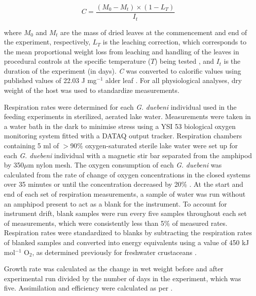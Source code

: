 \begin{equation}
C=  \frac{(M_0-M_t)\times(1-L_T)}{I_t}
\end{equation}

where $M_0$ and $M_t$ are the mass of dried leaves at the commencement and end of the experiment, respectively, $L_T$ is the leaching correction, which corresponds to the mean proportional weight loss from leaching and handling of the leaves in procedural controls at the specific temperature ($T$) being tested \cite{nilsson1974}, and $I_t$ is the duration of the experiment (in days). \emph{C} was converted to calorific values using published values of 22.03 J mg$^{-1}$  alder leaf \citep{adcock1982}. For all physiological analyses, dry weight of the host was used to standardize measurements. 

Respiration rates were determined for each \emph{G. duebeni} individual used in the feeding experiments in sterilized, aerated lake water. Measurements were taken in a water bath in the dark to minimise stress using a YSI 53 biological oxygen monitoring system fitted with a DATAQ output tracker. Respiration chambers containing 5 ml of  $>$90\% oxygen-saturated sterile lake water were set up for each \emph{G. duebeni} individual with a magnetic stir bar separated from the amphipod by 350$\mu$m nylon mesh. The oxygen consumption of each \emph{G. duebeni} was calculated from the rate of change of oxygen concentrations in the closed systems over 35 minutes or until the concentration decreased by 20\% \citep{penk2016}. At the start and end of each set of respiration measurements, a sample of water was run without an amphipod present to act as a blank for the instrument. To account for instrument drift, blank samples were run every five samples throughout each set of measurements, which were consistently less than 5\% of measured rates. Respiration rates were standardized to blanks by subtracting the respiration rates of blanked samples and converted into energy equivalents using a value of 450 kJ mol$^{-1}$ O$_2$, as determined previously for freshwater crustaceans \citep{gnaiger1983}. 

Growth rate was calculated as the change in wet weight before and after experimental run divided by the number of days in the experiment, which was five. Assimilation and efficiency were calculated as per \citet{nilsson1974}. 

